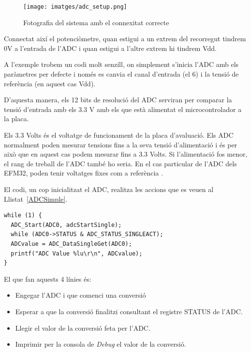 \begin{figure}
 \centering
 \texttt{[image: imatges/adc\_setup.png]}
 \caption{Fotografia del sistema amb el connexitat correcte}
 \label{fig:setup_adc}
\end{figure}

Connectat així el potenciòmetre, quan estigui a un extrem del recorregut tindrem 0V a l'entrada de l'ADC i quan estigui a l'altre extrem hi tindrem \gls{Vdd}.

A l'exemple trobem un codi molt senzill, on simplement s'inicia l'\gls{ADC} amb els paràmetres per defecte i només es canvia el canal d'entrada (el 6) i la tensió de referència (en aquest cas Vdd).

D'aquesta manera, els 12 bits de resolució del ADC serviran per comparar la tensió d'entrada amb els 3.3 V amb els que està alimentat el microcontrolador a la placa.

\begin{remark}
 Els 3.3 Volts és el voltatge de funcionament de la placa d'avaluació. Els ADC normalment poden mesurar tensions fins a la seva tensió d'alimentació i és per això que en aquest cas podem mesurar fins a 3.3 Volts. Si l'alimentació fos menor, el rang de treball de l'ADC també ho seria. En el cas particular de l'ADC dels EFM32, poden tenir voltatges fixes com a referència \cite[378]{EFM32GRM}.
\end{remark}

El codi, un cop inicialitzat el ADC, realitza les accions que es veuen al Llistat~\ref{ADCSimple}.
\begin{lstlisting}[frame=single,caption={Codi de lectura de l'ADC},style=customc, label=ADCSimple]
while (1) {
  ADC_Start(ADC0, adcStartSingle);
  while (ADC0->STATUS & ADC_STATUS_SINGLEACT);
  ADCvalue = ADC_DataSingleGet(ADC0);
  printf("ADC Value %lu\r\n", ADCvalue);
}
\end{lstlisting}

El que fan aquests 4 línies és:
\begin{itemize}
 \item Engegar l'ADC i que comenci una conversió
 \item Esperar a que la conversió finalitzi consultant el registre STATUS de l'ADC.
 \item Llegir el valor de la conversió feta per l'ADC.
 \item Imprimir per la consola de {\em Debug} el valor de la conversió.
\end{itemize}

